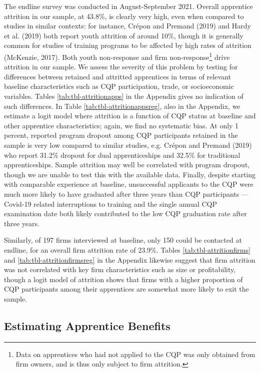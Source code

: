 \documentclass[
  11pt,
a4paper
]{article}
\begin{document}
The endline survey was conducted in August-September 2021. Overall apprentice attrition in our sample, at 43.8\%, is clearly very high, even when compared to studies in similar contexts: for instance, Crépon and Premand (2019) and Hardy et al. (2019) both report youth attrition of around 10\%, though it is generally common for studies of training programs to be affected by high rates of attrition (McKenzie, 2017). Both youth non-response and firm non-response\footnote{Data on apprentices who had not applied to the CQP was only obtained from firm owners, and is thus only subject to firm attrition.} drive attrition in our sample. We assess the severity of this problem by testing for differences between retained and attritted apprentices in terms of relevant baseline characteristics such as CQP participation, trade, or socioeconomic variables. Tables \ref{tab:tbl-attritionapps} in the Appendix gives no indication of such differences. In Table \ref{tab:tbl-attritionappsreg}, also in the Appendix, we estimate a logit model where attrition is a function of CQP status at baseline and other apprentice characteristics; again, we find no systematic bias. At only 1 percent, reported program dropout among CQP participants retained in the sample is very low compared to similar studies, e.g. Crépon and Premand (2019) who report 31.2\% dropout for dual apprenticeships and 32.5\% for traditional apprenticeships. Sample attrition may well be correlated with program dropout, though we are unable to test this with the available data. Finally, despite starting with comparable experience at baseline, unsuccessful applicants to the CQP were much more likely to have graduated after three years than CQP participants --- Covid-19 related interruptions to training and the single annual CQP examination date both likely contributed to the low CQP graduation rate after three years.

Similarly, of 197 firms interviewed at baseline, only 150 could be contacted at endline, for an overall firm attrition rate of 23.9\%. Tables \ref{tab:tbl-attritionfirms} and \ref{tab:tbl-attritionfirmsreg} in the Appendix likewise suggest that firm attrition was not correlated with key firm characteristics such as size or profitability, though a logit model of attrition shows that firms with a higher proportion of CQP participants among their apprentices are somewhat more likely to exit the sample.

\hypertarget{appmethod}{%
\subsection{Estimating Apprentice Benefits}\label{appmethod}}
\end{document}
